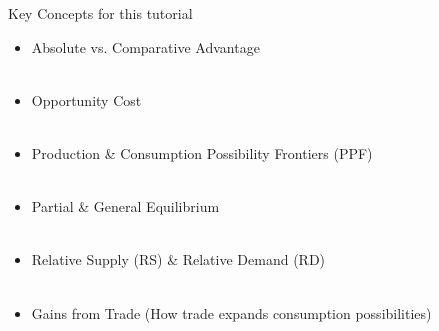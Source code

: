 \documentclass{beamer}
\begin{document}
    

\begin{frame}{Key Concepts for this tutorial}

\begin{itemize}
    \item Absolute vs. Comparative Advantage \\~\\ 
    \item Opportunity Cost \\~\\
    \item Production \& Consumption Possibility Frontiers (PPF) \\~\\
    \item Partial \& General Equilibrium \\~\\
    \item Relative Supply (RS) \& Relative Demand (RD) \\~\\
    \item Gains from Trade (How trade expands consumption possibilities)
\end{itemize}

\end{frame}



\end{document}
